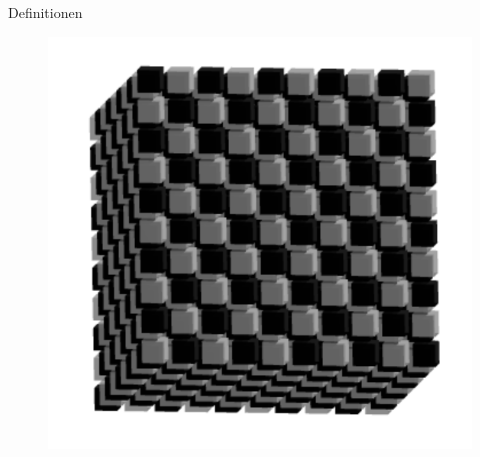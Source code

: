 \documentclass[aspectratio=169]{beamer}
\begin{document}
\begin{frame}{Definitionen}
\begin{multicols*}{3}
      \begin{figure}[H]
          \centering
          \includegraphics[width = 0.35 \textheight]{3d_cellspace.png}
      \end{figure}


    \end{multicols*}

  \end{frame}
\end{document}
